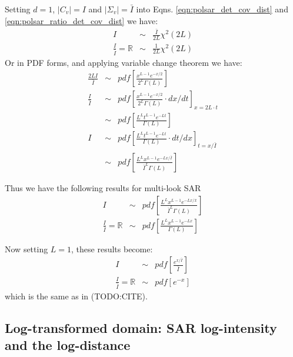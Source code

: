 \documentclass[journal]{IEEEtran}
\begin{document}
Setting $d=1$, $|C_v|=I$ and $|\Sigma_v|=\bar{I}$ into Eqns. \ref{eqn:polsar_det_cov_dist} and \ref{eqn:polsar_ratio_det_cov_dist}
we have:
\begin{eqnarray*}
  I &\sim& \frac{\bar{I}}{2L} \chi^2(2L)  \\
  \frac{I}{\bar{I}} = \mathbb{R} &\sim& \frac{1}{2L}  \chi^2(2L)   
\end{eqnarray*}
Or in PDF forms, and applying variable change theorem we have:
\begin{eqnarray*}
    \frac{2L I}{\bar{I}} &\sim& pdf \left[ \frac{x^{L-1}e^{-x/2}}{2^L \Gamma(L)} \right] \\
  \frac{I}{\bar{I}} &\sim& pdf \left[ \frac{x^{L-1}e^{-x/2}}{2^L \Gamma(L)} \cdot dx/dt \right]_{x=2L \cdot t} \\
    &\sim& pdf \left[ \frac{ L^{L} t^{L-1} e^{-Lt}}{ \Gamma(L)} \right] \\
  I &\sim& pdf \left[ \frac{ L^{L} t^{L-1} e^{-Lt}}{ \Gamma(L)} \cdot dt/dx \right]_{t=x/\bar{I}}  \\
    &\sim& pdf \left[ \frac{ L^{L} x^{L-1} e^{-Lx/\bar{I}}}{ \bar{I}^{L}\Gamma(L)} \right]
\end{eqnarray*}

Thus we have the following results for multi-look SAR
\begin{eqnarray}
    I &\sim& pdf \left[ \frac{ L^{L} x^{L-1} e^{-Lx/\bar{x}}}{ \bar{I}^{L}\Gamma(L)} \right] \label{eqn:multi_look_SAR_intensity_dist} \\
    \frac{I}{\bar{I}} = \mathbb{R} &\sim& pdf \left[ \frac{ L^{L} x^{L-1} e^{-Lx}}{ \Gamma(L)} \label{eqn:multi_look_SAR_ratio_dist} \right] 
\end{eqnarray}

Now setting $L=1$, these results become:
\begin{eqnarray}
    I &\sim& pdf \left[ \frac{ e^{x/\bar{I}}}{ \bar{I}} \right] \\
    \frac{I}{\bar{I}} = \mathbb{R} &\sim& pdf \left[ e^{-x} \right] 
\end{eqnarray}
which is the same as in (TODO:CITE).

\subsection{Log-transformed domain: SAR log-intensity and the log-distance}
\end{document}
